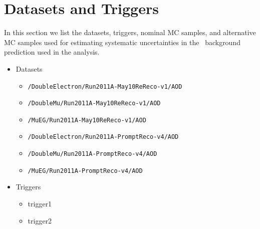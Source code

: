 \section{Datasets and Triggers}
\label{sec:datasets}

In this section we list the datasets, triggers, nominal MC samples, and alternative MC samples
used for estimating systematic uncertainties in the \ttbar\ background prediction used in the analysis.

\footnotesize{
\begin{itemize}
\item Datasets
  \begin{itemize}
  \item \verb=/DoubleElectron/Run2011A-May10ReReco-v1/AOD=
  \item \verb=/DoubleMu/Run2011A-May10ReReco-v1/AOD=
  \item \verb=/MuEG/Run2011A-May10ReReco-v1/AOD=
  \item \verb=/DoubleElectron/Run2011A-PromptReco-v4/AOD=
  \item \verb=/DoubleMu/Run2011A-PromptReco-v4/AOD=
  \item \verb=/MuEG/Run2011A-PromptReco-v4/AOD=
  \end{itemize}

\item Triggers
  \begin{itemize}
    \item trigger1
    \item trigger2
  \end{itemize}


\end{itemize}}

